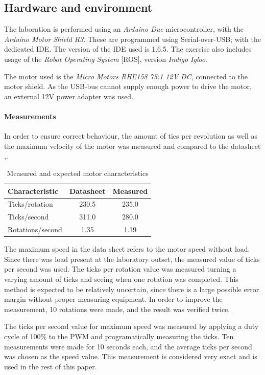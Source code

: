 \documentclass[11pt]{article}
\begin{document}
\subsection{Hardware and environment}
The laboration is performed using an \emph{Arduino Due} microcontroller, with the \emph{Arduino Motor Shield R3}. These are programmed using Serial-over-USB; with the dedicated IDE. The version of the IDE used is 1.6.5. The exercise also includes usage of the \emph{Robot Operating System} [ROS], version \emph{Indigo Igloo}. \par

The motor used is the \emph{Micro Motors RHE158 75:1 12V DC}, connected to the motor shield. As the USB-bus cannot supply enough power to drive the motor, an external 12V power adapter was used.
\paragraph{Measurements}
In order to ensure correct behaviour, the amount of tics per revolution as well as the maximum velocity of the motor was measured and compared to the datasheet \cite{datasheet_motor_1},\cite{datasheet_motor_2}. \par
\begin{table}[!htbp]
  \centering
  \caption{Measured and expected motor characteristics}
  \begin{tabular}{l|cc}
    Characteristic & Datasheet & Measured \\ \hline
    Ticks/rotation & 230.5 &235.0\\ 
    Ticks/second & 311.0 & 280.0\\
    Rotations/second & 1.35 & 1.19
  \end{tabular}
  \label{tab:measurements}
\end{table}
The maximum speed in the data sheet refers to the motor speed without load. Since there was load present at the laboratory outset, the measured value of ticks per second was used. The ticks per rotation value was measured turning a varying amount of ticks and seeing when one rotation was completed. This method is expected to be relatively uncertain, since there is a large possible error margin without proper measuring equipment. In order to improve the measurement, 10 rotations were made, and the result was verified twice. \par

The ticks per second value for maximum speed was measured by applying a duty cycle of 100\% to the PWM and programatically measuring the ticks. Ten measurements were made for 10 seconds each, and the average ticks per second was chosen as the speed value. This measurement is considered very exact and is used in the rest of this paper. 
\end{document}
